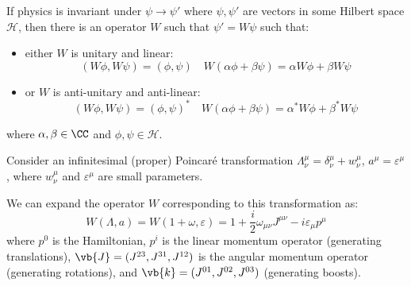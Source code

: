 \documentclass{jknotes}
\begin{document}
\begin{theorem}[Wigner]
    If physics is invariant under \(\psi\rightarrow\psi'\) where \(\psi,\psi'\) are vectors in some Hilbert space \(\mathcal{H}\), then there is an operator \(W\) such that \(\psi'=W\psi\) such that:
    \begin{itemize}
        \item either \(W\) is unitary and linear:
            \begin{equation}
                (W\phi,W\psi) = (\phi,\psi)
                \quad
                W(\alpha\phi + \beta\psi) = \alpha W\phi + \beta W\psi
            \end{equation}
        \item or \(W\) is anti-unitary and anti-linear:
            \begin{equation}
                (W\phi,W\psi) = (\phi,\psi)^*
                \quad
                W(\alpha\phi + \beta\psi) = \alpha^* W\phi + \beta^* W\psi
            \end{equation}
    \end{itemize}
    where \(\alpha,\beta\in\CC\) and \(\phi,\psi\in\mathcal{H}\).
\end{theorem}

Consider an infinitesimal (proper) Poincar\'e transformation \(\Lambda^\mu_\nu = \delta^\mu_\nu + w^\mu_\nu\), \(a^\mu = \varepsilon^\mu\), where \(w^\mu_\nu\) and \(\varepsilon^\mu\) are small parameters.

We can expand the operator \(W\) corresponding to this transformation as:
\begin{equation}
    W(\Lambda,a) = W(1+\omega,\varepsilon) = 1 + \frac{i}{2}\omega_{\mu\nu}J^{\mu\nu}-i\varepsilon_\mu p^\mu
    \tag{\(*\)}
    \label{infipoincare}
\end{equation}
where \(p^0\) is the Hamiltonian, \(p^i\) is the linear momentum operator (generating translations), \(\vb{J}=(J^{23},J^{31},J^{12})\) is the angular momentum operator (generating rotations), and \(\vb{k}=(J^{01},J^{02},J^{03})\) (generating boosts).
\end{document}
